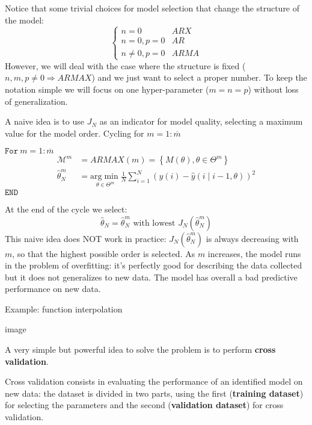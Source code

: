 Notice that some trivial choices for model selection that change the structure of the model:
\begin{equation*}
\begin{cases}
n=0 & ARX\\
n=0,p=0 & AR\\
n\neq 0,p=0 & ARMA
\end{cases}
\end{equation*}
However, we will deal with the case where the structure is fixed ($ n,m,p\neq 0\Longrightarrow ARMAX$) and we just want to select a proper number. To keep the notation simple we will focus on one hyper-parameter ($ m=n=p$) without loss of generalization.



A naive idea is to use $ J_{N}$ as an indicator for model quality, selecting a maximum value for the model order. Cycling for $ m=1:\overline{m}$

$ \mathtt{For }\ m=1:\overline{m}$
\begin{equation*}
\begin{aligned}
\mathcal{M}^{m} & =ARMAX(m) =\left\{M(\theta) ,\theta \in \Theta ^{m}\right\}\\
\hat{\theta }_{N}^{m} & =\underset{\theta \in \Theta ^{m}}{\mathrm{arg}\min}\frac{1}{N}\sum _{i=1}^{N}(y(i) -\hat{y}(i\mid i-1,\theta))^{2}
\end{aligned}
\end{equation*}
$ \mathtt{END}$

At the end of the cycle we select:
\begin{equation*}
\hat{\theta }_{N} =\hat{\theta }_{N}^{m} \text{ with lowest } J_{N}\left(\hat{\theta }_{N}^{m}\right)
\end{equation*}
This naive idea does NOT work in practice: $ J_{N}\left(\hat{\theta }_{N}^{m}\right)$ is always decreasing with $ m$, so that the highest possible order is selected. As $ m$ increases, the model runs in the problem of overfitting: it's perfectly good for describing the data collected but it does not generalizes to new data. The model has overall a bad predictive performance on new data.



Example: function interpolation



image

A very simple but powerful idea to solve the problem is to perform \textbf{cross validation}.

Cross validation consists in evaluating the performance of an identified model on new data: the dataset is divided in two parts, using the first (\textbf{training dataset}) for selecting the parameters and the second (\textbf{validation dataset}) for cross validation.

